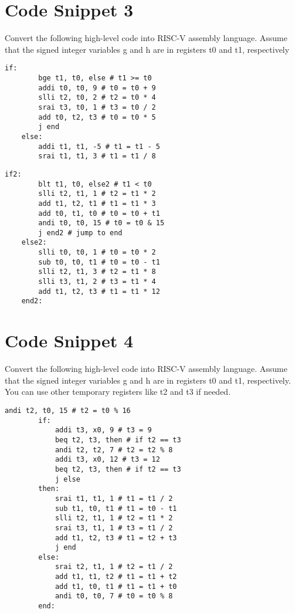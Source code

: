 \documentclass[12pt]{article}
\begin{document}
    \newpage
    \section{Code Snippet 3}
    \begin{flushleft}
        Convert the following high-level code into RISC-V assembly language. Assume
        that the signed integer variables g and h are in registers t0 and t1, respectively
    \end{flushleft}
    \begin{lstlisting}[language=RISCV]
    if:
        bge t1, t0, else # t1 >= t0
        addi t0, t0, 9 # t0 = t0 + 9
        slli t2, t0, 2 # t2 = t0 * 4
        srai t3, t0, 1 # t3 = t0 / 2
        add t0, t2, t3 # t0 = t0 * 5
        j end
    else:
        addi t1, t1, -5 # t1 = t1 - 5
        srai t1, t1, 3 # t1 = t1 / 8
    \end{lstlisting}

    \begin{lstlisting}[language=RISCV]
    if2:
        blt t1, t0, else2 # t1 < t0
        slli t2, t1, 1 # t2 = t1 * 2
        add t1, t2, t1 # t1 = t1 * 3
        add t0, t1, t0 # t0 = t0 + t1
        andi t0, t0, 15 # t0 = t0 & 15
        j end2 # jump to end
    else2:
        slli t0, t0, 1 # t0 = t0 * 2
        sub t0, t0, t1 # t0 = t0 - t1 
        slli t2, t1, 3 # t2 = t1 * 8
        slli t3, t1, 2 # t3 = t1 * 4
        add t1, t2, t3 # t1 = t1 * 12
    end2:
        \end{lstlisting}
    \newpage
    \section{Code Snippet 4}
    \begin{flushleft}
        Convert the following high-level code into RISC-V assembly language. Assume
        that the signed integer variables g and h are in registers t0 and t1, respectively. You can
        use other temporary registers like t2 and t3 if needed.        
    \end{flushleft}
    \begin{lstlisting}[language=RISCV]
        andi t2, t0, 15 # t2 = t0 % 16
        if:
            addi t3, x0, 9 # t3 = 9
            beq t2, t3, then # if t2 == t3
            andi t2, t2, 7 # t2 = t2 % 8
            addi t3, x0, 12 # t3 = 12
            beq t2, t3, then # if t2 == t3
            j else
        then:
            srai t1, t1, 1 # t1 = t1 / 2
            sub t1, t0, t1 # t1 = t0 - t1
            slli t2, t1, 1 # t2 = t1 * 2
            srai t3, t1, 1 # t3 = t1 / 2
            add t1, t2, t3 # t1 = t2 + t3
            j end
        else:
            srai t2, t1, 1 # t2 = t1 / 2
            add t1, t1, t2 # t1 = t1 + t2
            add t1, t0, t1 # t1 = t1 + t0
            andi t0, t0, 7 # t0 = t0 % 8
        end:
    \end{lstlisting}
\end{document}
